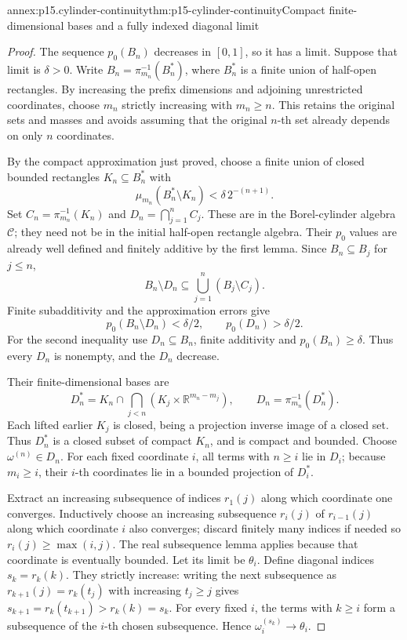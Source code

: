 \begin{annexitem}{annex:p15.cylinder-continuity}{thm:p15-cylinder-continuity}{Compact finite-dimensional bases and a fully indexed diagonal limit}
\begin{proof}
The sequence \(p_0(B_n)\) decreases in \([0,1]\), so it has
a limit. Suppose that limit is \(\delta>0\). Write
\(B_n=\pi_{m_n}^{-1}(B_n^*)\), where \(B_n^*\) is a finite
union of half-open rectangles. By increasing the prefix dimensions
and adjoining unrestricted coordinates, choose \(m_n\) strictly
increasing with \(m_n\geq n\). This retains the original sets
and masses and avoids assuming that the original \(n\)-th set
already depends on only \(n\) coordinates.

By the compact approximation just proved, choose a finite union
of closed bounded rectangles \(K_n\subseteq B_n^*\) with
\[
 \mu_{m_n}(B_n^*\setminus K_n)<\delta\,2^{-(n+1)}.
\]
Set \(C_n=\pi_{m_n}^{-1}(K_n)\) and
\(D_n=\bigcap_{j=1}^n C_j\). These are in the Borel-cylinder
algebra \(\mathcal C\); they need not be in the initial
half-open rectangle algebra. Their \(p_0\) values are already
well defined and finitely additive by the first lemma.
Since \(B_n\subseteq B_j\) for \(j\leq n\),
\[
 B_n\setminus D_n\subseteq
                      \bigcup_{j=1}^n(B_j\setminus C_j).
\]
Finite subadditivity and the approximation errors give
\[
 p_0(B_n\setminus D_n)<\delta/2,
 \qquad p_0(D_n)>\delta/2.
\]
For the second inequality use \(D_n\subseteq B_n\), finite
additivity and \(p_0(B_n)\geq\delta\). Thus every \(D_n\)
is nonempty, and the \(D_n\) decrease.

Their finite-dimensional bases are
\[
 D_n^*=K_n\cap\bigcap_{j<n}
                    (K_j\times\mathbb R^{m_n-m_j}),
 \qquad D_n=\pi_{m_n}^{-1}(D_n^*).
\]
Each lifted earlier \(K_j\) is closed, being a projection
inverse image of a closed set. Thus \(D_n^*\) is a closed
subset of compact \(K_n\), and is compact and bounded. Choose
\(\omega^{(n)}\in D_n\). For each fixed coordinate \(i\),
all terms with \(n\geq i\) lie in \(D_i\); because
\(m_i\geq i\), their \(i\)-th coordinates lie in a bounded
projection of \(D_i^*\).

Extract an increasing subsequence of indices \(r_1(j)\) along
which coordinate one converges. Inductively choose an increasing
subsequence \(r_i(j)\) of \(r_{i-1}(j)\) along which
coordinate \(i\) also converges; discard finitely many indices
if needed so \(r_i(j)\geq\max(i,j)\). The real subsequence
lemma applies because that coordinate is eventually bounded.
Let its limit be \(\theta_i\). Define diagonal indices
\(s_k=r_k(k)\). They strictly increase: writing the next
subsequence as \(r_{k+1}(j)=r_k(t_j)\) with increasing
\(t_j\geq j\) gives \(s_{k+1}=r_k(t_{k+1})>r_k(k)=s_k\).
For every fixed \(i\), the terms with \(k\geq i\) form
a subsequence of the \(i\)-th chosen subsequence. Hence
\(\omega^{(s_k)}_i\to\theta_i\).


\end{proof}
\end{annexitem}
